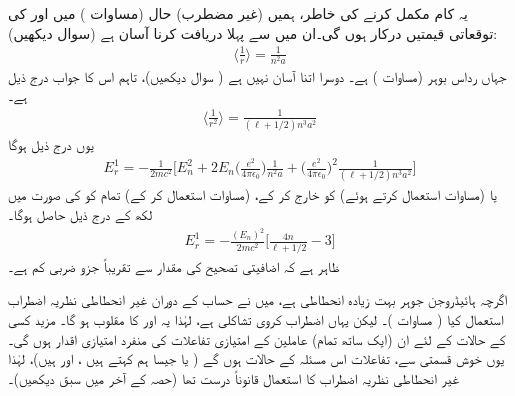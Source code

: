 یہ کام مکمل کرنے کی خاطر، ہمیں (غیر مضطرب) حال  (مساوات ) میں  اور  کی توقعاتی قیمتیں درکار ہوں گی۔ان میں سے پہلا دریافت کرنا آسان ہے (سوال  دیکھیں):
\begin{align}\label{مساوات_غیر_مضطرب_آر_ایک}
\big\langle \frac{1}{r} \big\rangle = \frac{1}{n^2 a}
\end{align}
جہاں  رداس بوہر (مساوات ) ہے۔ دوسرا اتنا آسان نہیں ہے ( سوال  دیکھیں)، تاہم اس کا جواب درج ذیل ہے۔
\begin{align}\label{مساوات_غیر_مضطرب_آر_دوم}
\big\langle \frac{1}{r^2} \big\rangle = \frac{1}{(\ell + 1/2)n^3 a^2}
\end{align}
یوں درج ذیل ہوگا 
\begin{align*}
E_r^1 = - \frac{1}{2mc^2} \big [ E_n^2 + 2 E_n \big(\frac{e^2}{4 \pi \epsilon_0}\big) \frac{1}{n^2 a} + \big(\frac{e^2}{4 \pi \epsilon_0}\big)^2 \frac{1}{(\ell + 1/2)n^3 a^2} \big ]
\end{align*}
یا (مساوات  استعمال کرتے ہوئے)  کو خارج کر کے، (مساوات  استعمال کر کے) تمام کو  کی صورت میں لکھ کے درج ذیل حاصل ہوگا۔
\begin{align}\label{مساوات_غیر_مضطرب_اضافیتی_تصحیح}
E_r^1 = - \frac{(E_n)^2}{2mc^2} \big [ \frac{4n}{\ell + 1/2} - 3 \big ]
\end{align}
ظاہر ہے کہ اضافیتی تصحیح کی مقدار  سے تقریباً جزو ضربی کم ہے۔

اگرچہ ہائیڈروجن جوہر بہت زیادہ انحطاطی ہے، میں نے حساب کے دوران غیر انحطاطی نظریہ اضطراب استعمال کیا ( مساوات )۔ لیکن یہاں اضطراب کروی تشاکلی ہے، لہٰذا یہ  اور  کا مقلوب ہو گا۔ مزید کسی  کے  حالات کے لئے ان (ایک ساتھ تمام) عاملین کے امتیازی تفاعلات کی منفرد امتیازی اقدار ہوں گی۔ یوں خوش قسمتی سے، تفاعلات  اس مسئلہ کے حالات ہوں گے ( یا جیسا ہم کہتے ہیں ،  اور   ہیں)، لہٰذا غیر انحطاطی نظریہ اضطراب کا استعمال قانوناً درست تھا (حصہ  کے آخر میں سبق دیکھیں)۔


